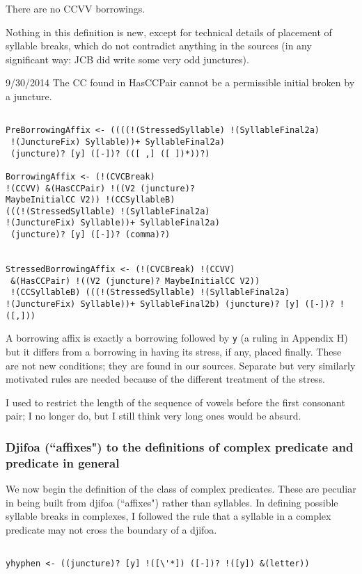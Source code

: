 \documentclass[12pt]{article}
\begin{document}
There are no CCVV borrowings.

Nothing in this definition is new, except for technical details of placement of syllable breaks, which do not contradict anything in the sources (in any significant way:  JCB did write some very odd junctures).

9/30/2014  The CC found in HasCCPair cannot be a permissible initial broken by a juncture.

\begin{verbatim}

PreBorrowingAffix <- ((((!(StressedSyllable) !(SyllableFinal2a)
 !(JunctureFix) Syllable))+ SyllableFinal2a)
 (juncture)? [y] ([-])? (([ ,] ([ ])*))?)

BorrowingAffix <- (!(CVCBreak) 
!(CCVV) &(HasCCPair) !((V2 (juncture)? 
MaybeInitialCC V2)) !(CCSyllableB) 
(((!(StressedSyllable) !(SyllableFinal2a) 
!(JunctureFix) Syllable))+ SyllableFinal2a)
 (juncture)? [y] ([-])? (comma)?)


StressedBorrowingAffix <- (!(CVCBreak) !(CCVV)
 &(HasCCPair) !((V2 (juncture)? MaybeInitialCC V2))
 !(CCSyllableB) (((!(StressedSyllable) !(SyllableFinal2a) 
!(JunctureFix) Syllable))+ SyllableFinal2b) (juncture)? [y] ([-])? !([,]))

\end{verbatim}

A borrowing affix is exactly a borrowing followed by {\tt y} (a ruling in Appendix H) but it differs from
a borrowing in having its stress, if any, placed finally.  These are not new conditions; they are found in our sources.
Separate but very similarly motivated rules are needed because of the different treatment of the stress.

I used to restrict the length of the sequence of vowels before the first consonant pair; I no longer do, but I still think very long ones would be absurd.

\subsubsection{Djifoa (``affixes") to the definitions of complex predicate and predicate in general}

We now begin the definition of the class of complex predicates.  These are peculiar in being built from djifoa
(``affixes") rather than syllables.  In defining possible syllable breaks in complexes, I followed the rule that a syllable
in a complex predicate may not cross the boundary of a djifoa.

\begin{verbatim}

yhyphen <- ((juncture)? [y] !([\'*]) ([-])? !([y]) &(letter))

\end{verbatim}
\end{document}
